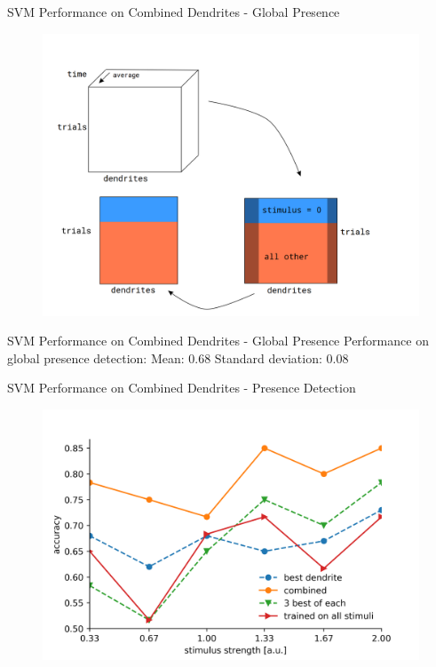 \documentclass[10pt]{beamer}
\begin{document}
\begin{frame}[fragile]{SVM Performance on Combined Dendrites - Global Presence}
\begin{center}
	\begin{figure}
      \includegraphics[width=1.0\textwidth]{data_p_tot.png}
	\end{figure}
	\end{center}
\end{frame}

\begin{frame}[fragile]{SVM Performance on Combined Dendrites - Global Presence}
Performance on global presence detection: \newline
Mean: 0.68 \newline
Standard deviation: 0.08
\end{frame}

\begin{frame}[fragile]{SVM Performance on Combined Dendrites - Presence Detection}
\begin{center}
	\begin{figure}
      \includegraphics[width=1.0\textwidth]{combined_presence_alt.png}
	\end{figure}
	\end{center}
\end{frame}
\end{document}
